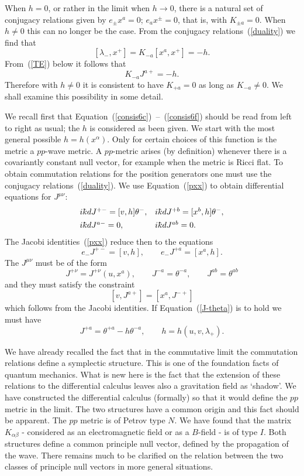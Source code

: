 \documentclass[12pt,a4paper]{article}
\newcounter{eg}
\def\kbar{{\mathchar'26\mkern-9muk}}
\begin{document}
When $h=0$, or rather in the limit when $h\to 0$, there is a natural set
of conjugacy relations given by $e_\pm x^a = 0$; $e_a x^\pm = 0$, that
is, with $K_{\pm a} = 0$. When $h \neq 0$ this can no longer be the case.
From the conjugacy relations~(\ref{duality}) we find that
$$
[\lambda_-, x^+] = K_{-a} [x^a, x^+] = -h.
$$
From~(\ref{TE}) below it follows that 
$$
K_{-a} J^{a+} = - h.
$$
Therefore with $h \neq 0$ it is consistent to have $K_{+a} = 0$ as
long as $K_{-a} \neq 0$. We shall examine this possibility in some detail.

We recall first that Equation~(\ref{consis6c})~--~(\ref{consis6f})
should be read from left to right as usual; the $h$ is considered as
been given. We start with the most general possible $h = h(x^\alpha)$.
Only for certain choices of this function is the metric a $pp$-wave
metric. A $pp$-metric arises (by definition) whenever there is a
covariantly constant null vector, for example when the metric is
Ricci flat. To obtain commutation relations for the
position generators one must use the conjugacy
relations~(\ref{duality}). We use Equation~(\ref{pxx}) to obtain
differential equations for $J^{\mu\nu}$:
$$
\begin{array}{ll}
i\kbar dJ^{+-} = [v,h] \theta^-,
&i\kbar dJ^{+b} = [x^b,h] \theta^-, \\[4pt] 
i\kbar dJ^{a-} = 0,
&i\kbar dJ^{ab} = 0.
\end{array}
$$
The Jacobi identities~(\ref{pxx}) reduce then to the equations
$$
e_- J^{+-} = [v,h], \qquad e_- J^{+a} = [x^a,h].
$$
The $J^{\mu\nu}$ must be of the form
$$
J^{+\nu} = J^{+\nu}(u, x^a), \qquad J^{-a} = \theta^{-a}, \qquad
J^{ab} = \theta^{ab}
$$
and they must satisfy the constraint
$$
[v, J^{a+}] = [x^a, J^{-+}]
$$
which follows from the Jacobi identities.  If
Equation~(\ref{J-theta}) is to hold we must have
\begin{equation}
J^{+a} = \theta^{+a} - h \theta^{-a}, \qquad 
h = h(u,v,\lambda_+).\label{TE}
\end{equation}

We have already recalled the fact that in the commutative limit the
commutation relations define a symplectic structure. This is one of
the foundation facts of quantum mechanics.  What is new here is the
fact that the extension of these relations to the differential
calculus leaves also a gravitation field as `shadow'.  We have
constructed the differential calculus (formally) so that it would
define the $pp$ metric in the limit. The two structures have a common
origin and this fact should be apparent.  The $pp$ metric is of Petrov
type $N$. We have found that the matrix~$K_{\alpha\beta}$ - considered
as an electromagnetic field or as a $B$-field - is of type $I$. Both
structures define a common principle null vector, defined by the
propagation of the wave. There remains much to be clarified on the
relation between the two classes of principle null vectors in more
general situations.
\end{document}
